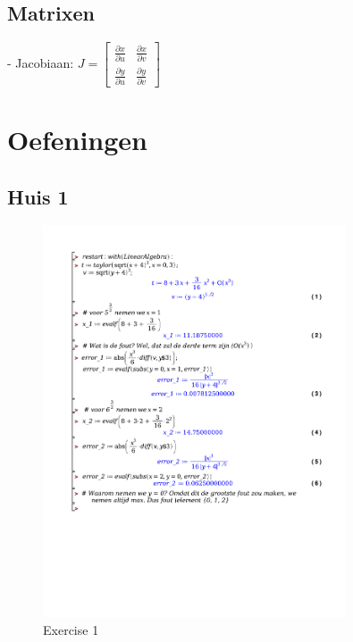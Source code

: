 \documentclass[a4paper]{report}
\begin{document}
\subsection*{Matrixen}

- Jacobiaan: $J = \begin{bmatrix} \frac{\partial x}{\partial u} & \frac{\partial x}{\partial v} \\ \frac{\partial y}{\partial u} & \frac{\partial y}{\partial v} \end{bmatrix}$

\section*{Oefeningen}

\subsection*{Huis 1}

\begin{figure}[!htbp]
	\centering
	\includegraphics[width=0.8\textwidth]{./exercises/huis_1_ex_1.pdf}
	\caption{Exercise 1}
\end{figure}
\end{document}
